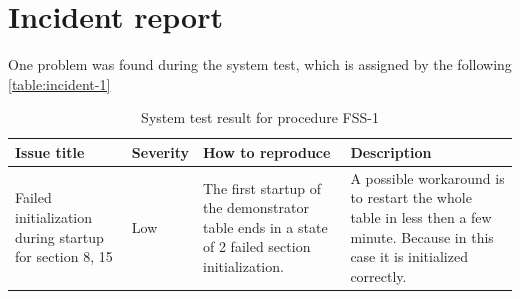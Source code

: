 \section{Incident report}
One problem was found during the system test, which is assigned by the following \autoref{table:incident-1}
\begin{table}[H]
	\caption{System test result for procedure FSS-1}
	\label{table:incident-1}
	\begin{center}
		\renewcommand{\arraystretch}{1.8}
		\begin{tabu} 
			to 0.9 \textwidth
			{ X[2.0, l] X[1.0, l] X[2.5, l] X[2.5, l] }
			\toprule
			Issue title                                            & Severity & How to reproduce                                                                                & Description                                                                                                                      \\ \midrule
			Failed initialization during startup for section 8, 15 & Low      & The first startup of the demonstrator table ends in a state of 2 failed section initialization. & A possible workaround is to restart the whole table in less then a few minute. Because in this case it is initialized correctly. \\ \bottomrule
		\end{tabu}
	\end{center}
\end{table}

